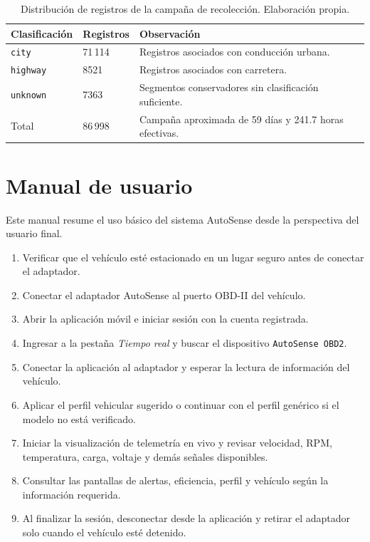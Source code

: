 \documentclass[12pt,letterpaper]{report}
\begin{document}
\begin{table}[!htbp]
\centering
\scriptsize
\caption{Distribución de registros de la campaña de recolección. Elaboración propia.}
\label{tab:anexo-campania}
\begin{tabular}{@{}p{}p{}p{}@{}}
\toprule
\textbf{Clasificación} & \textbf{Registros} & \textbf{Observación} \\
\midrule
\texttt{city} & 71\,114 & Registros asociados con conducción urbana. \\
\texttt{highway} & 8521 & Registros asociados con carretera. \\
\texttt{unknown} & 7363 & Segmentos conservadores sin clasificación suficiente. \\
Total & 86\,998 & Campaña aproximada de 59 días y 241.7 horas efectivas. \\
\bottomrule
\end{tabular}
\end{table}

\chapter{Manual de usuario}

Este manual resume el uso básico del sistema AutoSense desde la perspectiva del usuario final.

\begin{enumerate}
    \item Verificar que el vehículo esté estacionado en un lugar seguro antes de conectar el adaptador.
    \item Conectar el adaptador AutoSense al puerto OBD-II del vehículo.
    \item Abrir la aplicación móvil e iniciar sesión con la cuenta registrada.
    \item Ingresar a la pestaña \emph{Tiempo real} y buscar el dispositivo \texttt{AutoSense OBD2}.
    \item Conectar la aplicación al adaptador y esperar la lectura de información del vehículo.
    \item Aplicar el perfil vehicular sugerido o continuar con el perfil genérico si el modelo no está verificado.
    \item Iniciar la visualización de telemetría en vivo y revisar velocidad, RPM, temperatura, carga, voltaje y demás señales disponibles.
    \item Consultar las pantallas de alertas, eficiencia, perfil y vehículo según la información requerida.
    \item Al finalizar la sesión, desconectar desde la aplicación y retirar el adaptador solo cuando el vehículo esté detenido.
\end{enumerate}
\end{document}

